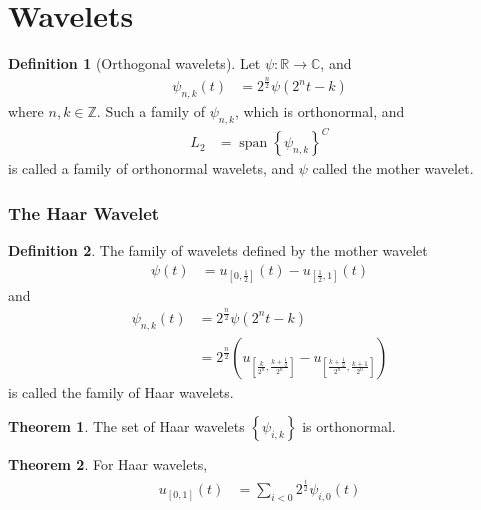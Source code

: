 \documentclass[titlepage, fleqn, a4paper, 12pt, twoside]{article}
\theoremstyle{definition}
\newtheorem{definition}{Definition}
\theoremstyle{theorem}
\newtheorem{theorem}{Theorem}
\DeclareMathOperator{\vspan}{\mathrm{span}}
\begin{document}
\clearpage
\part{Wavelets}

\begin{definition}[Orthogonal wavelets]
	Let $\psi: \mathbb{R} \to \mathbb{C}$, and
	\begin{align*}
		\psi_{n,k}(t) &= 2^{\frac{n}{2}} \psi\left( 2^n t - k \right)
	\end{align*}
	where $n, k \in \mathbb{Z}$.
	Such a family of $\psi_{n,k}$, which is orthonormal, and
	\begin{align*}
		L_2 &= {\vspan{\left\{ \psi_{n,k} \right\}}}^{C}
	\end{align*}
	is called a family of orthonormal wavelets, and $\psi$ called the mother wavelet.
\end{definition}
%
\section{The Haar Wavelet}

\begin{definition}
	The family of wavelets defined by the mother wavelet
	\begin{align*}
		\psi(t) &= u_{\left[ 0, \frac{1}{2} \right]}(t) - u_{\left[ \frac{1}{2},1 \right]}(t)
	\end{align*}
	and
	\begin{align*}
		\psi_{n,k}(t) &= 2^{\frac{n}{2}} \psi\left( 2^n t - k \right)\\
		&= 2^{\frac{n}{2}} \left( u_{\left[ \frac{k}{2^n} , \frac{k + \frac{1}{2}}{2^n} \right]} - u_{\left[ \frac{k + \frac{1}{2}}{2^n} , \frac{k + 1}{2^n} \right]} \right)
	\end{align*}
	is called the family of Haar wavelets.
\end{definition}

\begin{theorem}
	The set of Haar wavelets $\left\{ \psi_{i,k} \right\}$ is orthonormal.
\end{theorem}

\begin{theorem}
	For Haar wavelets,
	\begin{align*}
		u_{[0,1]}(t) &= \sum\limits_{i < 0} 2^{\frac{i}{2}} \psi_{i,0}(t)
	\end{align*}
\end{theorem}

\clearpage
\printindex
\end{document}
